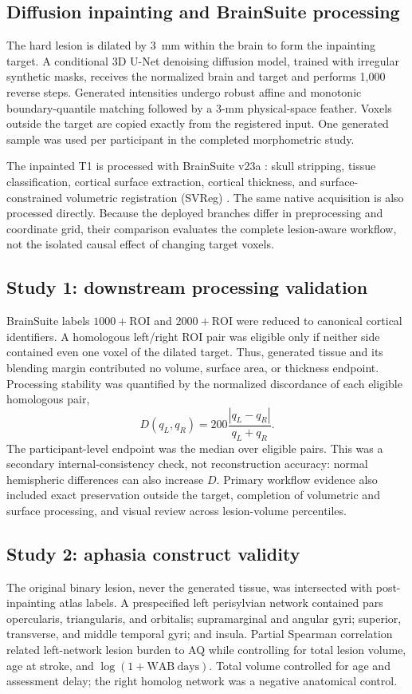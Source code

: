 \documentclass[runningheads]{llncs}
\begin{document}
\subsection{Diffusion inpainting and BrainSuite processing}
The hard lesion is dilated by 3~mm within the brain to form the inpainting
target. A conditional 3D U-Net denoising diffusion model, trained with irregular
synthetic masks, receives the normalized brain and target and performs 1,000
reverse steps. Generated intensities undergo robust affine and monotonic
boundary-quantile matching followed by a 3-mm physical-space feather. Voxels
outside the target are copied exactly from the registered input. One generated
sample was used per participant in the completed morphometric study.

The inpainted T1 is processed with BrainSuite v23a
\cite{Shattuck2002}: skull stripping, tissue classification, cortical surface
extraction, cortical thickness, and surface-constrained volumetric registration
(SVReg) \cite{Joshi2009}. The same native acquisition is also processed
directly. Because the deployed branches differ in preprocessing and coordinate
grid, their comparison evaluates the complete lesion-aware workflow, not the
isolated causal effect of changing target voxels.

\subsection{Study 1: downstream processing validation}
BrainSuite labels $1000+\mathrm{ROI}$ and $2000+\mathrm{ROI}$ were reduced to
canonical cortical identifiers. A homologous left/right ROI pair was eligible
only if neither side contained even one voxel of the dilated target. Thus,
generated tissue and its blending margin contributed no volume, surface area,
or thickness endpoint. Processing stability was quantified by the normalized
discordance of each eligible homologous pair,
\begin{equation}
 D(q_L,q_R)=200\frac{|q_L-q_R|}{q_L+q_R}.
 \label{eq:asymmetry}
\end{equation}
The participant-level endpoint was the median over eligible pairs. This was a
secondary internal-consistency check, not reconstruction accuracy: normal
hemispheric differences can also increase $D$. Primary workflow evidence also
included exact preservation outside the target, completion of volumetric and
surface processing, and visual review across lesion-volume percentiles.

\subsection{Study 2: aphasia construct validity}
The original binary lesion, never the generated tissue, was intersected with
post-inpainting atlas labels. A prespecified left perisylvian network contained
pars opercularis, triangularis, and orbitalis; supramarginal and angular gyri;
superior, transverse, and middle temporal gyri; and insula. Partial Spearman
correlation related left-network lesion burden to AQ while controlling for
total lesion volume, age at stroke, and $\log(1+\mathrm{WAB\ days})$. Total
volume controlled for age and assessment delay; the right homolog network was
a negative anatomical control.
\end{document}
